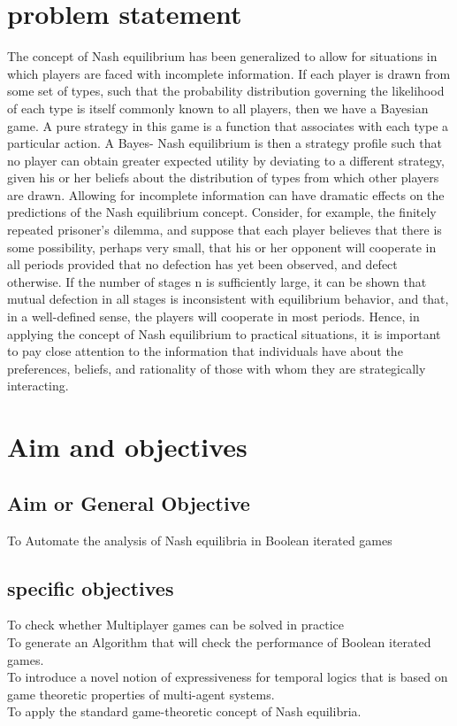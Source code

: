 \documentclass[14pt, a4paper]{article}
\begin{document}
				
			\section{problem statement}
The concept of Nash equilibrium has been generalized to allow for situations in which players are faced with incomplete information. If each player is drawn from some set of types, such that the probability distribution governing the likelihood of each type is itself commonly known to all players, then we have a Bayesian game. A pure strategy in this game is a function that associates with each type a particular action. A Bayes- Nash equilibrium is then a strategy profile such that no player can obtain greater expected utility by deviating to a
different strategy, given his or her beliefs about the distribution of types from which other players are drawn. Allowing for incomplete information can have dramatic effects on the predictions of the Nash equilibrium concept. Consider, for example, the finitely repeated prisoner’s
dilemma, and suppose that each player believes that there is some possibility, perhaps very small, that his or her opponent will cooperate in all periods provided that no defection has yet been observed, and defect otherwise. If the number of stages n is sufficiently large, it can be shown that mutual defection in all stages is inconsistent with equilibrium behavior, and that, in a well-defined sense, the players will cooperate in most periods. Hence, in applying the concept of Nash equilibrium to practical situations, it is important to pay close attention to the
information that individuals have about the preferences, beliefs, and rationality of those with whom they are strategically interacting.
			
			
			
			\section{Aim and objectives}
			
				\subsection{Aim or General Objective}
					To Automate the analysis of Nash equilibria in Boolean iterated games
		
		
				
				\subsection{specific objectives}
To check whether Multiplayer games can be solved in practice\\
To generate an Algorithm that will check the performance of Boolean iterated games.\\
To introduce a novel notion of expressiveness for temporal logics that is based on game theoretic properties of multi-agent systems.\\
To apply the standard game-theoretic concept of Nash equilibria.\\
\end{document}
